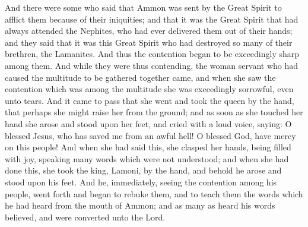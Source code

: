 And there were some who said that Ammon was sent by the Great Spirit to afflict them because of their iniquities; and that it was the Great Spirit that had always attended the Nephites, who had ever delivered them out of their hands; and they said that it was this Great Spirit who had destroyed so many of their brethren, the Lamanites.
\bverse \iffalse And thus the contention began to be exceedingly sharp among them. And while they were thus contending, the woman servant who had caused the multitude to be gathered together came, and when she saw the contention which was among the multitude she was exceedingly sorrowful, even unto tears. \fi
And thus the contention began to be exceedingly sharp among them. And while they were thus contending, the woman servant who had caused the multitude to be gathered together came, and when she saw the contention which was among the multitude she was exceedingly sorrowful, even unto tears.
\bverse \iffalse And it came to pass that she went and took the queen by the hand, that perhaps she might raise her from the ground; and as soon as she touched her hand she arose and stood upon her feet, and cried with a loud voice, saying: O blessed Jesus, who has saved me from an awful hell! O blessed God, have mercy on this people! \fi
And it came to pass that she went and took the queen by the hand, that perhaps she might raise her from the ground; and as soon as she touched her hand she arose and stood upon her feet, and cried with a loud voice, saying: O blessed Jesus, who has saved me from an awful hell! O blessed God, have mercy on this people!
\bverse \iffalse And when she had said this, she clasped her hands, being filled with joy, speaking many words which were not understood; and when she had done this, she took the king, Lamoni, by the hand, and behold he arose and stood upon his feet. \fi
And when she had said this, she clasped her hands, being filled with joy, speaking many words which were not understood; and when she had done this, she took the king, Lamoni, by the hand, and behold he arose and stood upon his feet.
\bverse \iffalse And he, immediately, seeing the contention among his people, went forth and began to rebuke them, and to teach them the words which he had heard from the mouth of Ammon; and as many as heard his words believed, and were converted unto the Lord. \fi
And he, immediately, seeing the contention among his people, went forth and began to rebuke them, and to teach them the words which he had heard from the mouth of Ammon; and as many as heard his words believed, and were converted unto the Lord.
